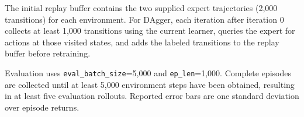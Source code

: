 \documentclass{article}
\begin{document}
The initial replay buffer contains the two supplied expert trajectories
(2,000 transitions) for each environment. For DAgger, each iteration after
iteration 0 collects at least 1,000 transitions using the current learner,
queries the expert for actions at those visited states, and adds the labeled
transitions to the replay buffer before retraining.

Evaluation uses \texttt{eval\_batch\_size}=5,000 and
\texttt{ep\_len}=1,000. Complete episodes are collected until at least
5,000 environment steps have been obtained, resulting in at least five
evaluation rollouts. Reported error bars are one standard deviation over
episode returns.
\end{document}
